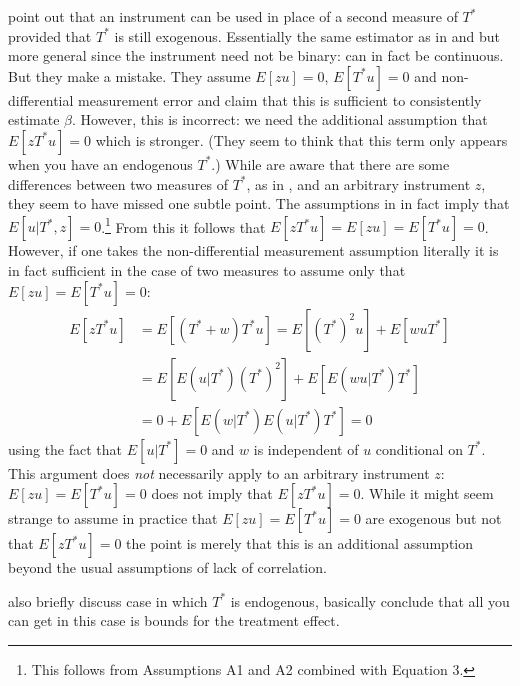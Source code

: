 \cite{FL} point out that an instrument can be used in place of a second measure of $T^*$ provided that $T^*$ is still exogenous.
Essentially the same estimator as in \cite{BBS} and \cite{KRS} but more general since the instrument need not be binary: can in fact be continuous.
But they make a mistake. 
They assume $E[zu]=0$, $E[T^*u]=0$ and non-differential measurement error and claim that this is sufficient to consistently estimate $\beta$.
However, this is incorrect: we need the additional assumption that $E[zT^*u]=0$ which is stronger.
(They seem to think that this term only appears when you have an endogenous $T^*$.)
While \cite{FL} are aware that there are some differences between two measures of $T^*$, as in \cite{BBS}, and an arbitrary instrument $z$, they seem to have missed one subtle point.
The assumptions in \cite{BBS} in fact imply that $E[u|T^*,z]=0$.\footnote{This follows from Assumptions A1 and A2 combined with Equation 3.}
From this it follows that $E[zT^*u]=E[zu]=E[T^*u]=0$. 
However, if one takes the non-differential measurement assumption literally it is in fact sufficient in the case of two measures to assume only that $E[zu]=E[T^*u]=0$:
\begin{align}
  E[zT^*u] &= E[(T^*+w)T^*u] = E[(T^*)^2u] + E[wuT^*]  \\
  &= E\left[ E\left( u|T^* \right)(T^*)^2 \right] + E\left[E\left( wu|T^* \right)T^*\right]\\
  &= 0 + E\left[ E(w|T^*)E(u|T^*)T^* \right] = 0
\end{align}
using the fact that $E[u|T^*]=0$ and $w$ is independent of $u$ conditional on $T^*$.
This argument does \emph{not} necessarily apply to an arbitrary instrument $z$: $E[zu]=E[T^*u]=0$ does not imply that $E[zT^*u]=0$.
While it might seem strange to assume in practice that $E[zu]=E[T^*u]=0$ are exogenous but not that $E[zT^*u]=0$ the point is merely that this is an additional assumption beyond the usual assumptions of lack of correlation. 


\cite{FL} also briefly discuss case in which $T^*$ is endogenous, basically conclude that all you can get in this case is bounds for the treatment effect.


